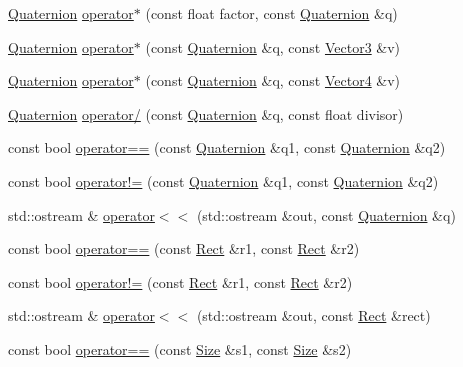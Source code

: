 \begin{DoxyCompactItemize}
\hyperlink{classprism_1_1_quaternion}{Quaternion} \hyperlink{namespaceprism_ad9f03413053b1efa6851344eb39a5982}{operator$\ast$} (const float factor, const \hyperlink{classprism_1_1_quaternion}{Quaternion} \&q)
\item 
\hyperlink{classprism_1_1_quaternion}{Quaternion} \hyperlink{namespaceprism_a8aebd3615ba448915f37140515a37b05}{operator$\ast$} (const \hyperlink{classprism_1_1_quaternion}{Quaternion} \&q, const \hyperlink{classprism_1_1_vector3}{Vector3} \&v)
\item 
\hyperlink{classprism_1_1_quaternion}{Quaternion} \hyperlink{namespaceprism_a2c4c5e120d8c4de9891f2261a50f100e}{operator$\ast$} (const \hyperlink{classprism_1_1_quaternion}{Quaternion} \&q, const \hyperlink{classprism_1_1_vector4}{Vector4} \&v)
\item 
\hyperlink{classprism_1_1_quaternion}{Quaternion} \hyperlink{namespaceprism_aec648937a53338bcd9879670877d0425}{operator/} (const \hyperlink{classprism_1_1_quaternion}{Quaternion} \&q, const float divisor)
\item 
const bool \hyperlink{namespaceprism_ac4ae112433b9ab32c801cccc9c3f74f0}{operator==} (const \hyperlink{classprism_1_1_quaternion}{Quaternion} \&q1, const \hyperlink{classprism_1_1_quaternion}{Quaternion} \&q2)
\item 
const bool \hyperlink{namespaceprism_a9e32551f997ae19dc52df146482405c1}{operator!=} (const \hyperlink{classprism_1_1_quaternion}{Quaternion} \&q1, const \hyperlink{classprism_1_1_quaternion}{Quaternion} \&q2)
\item 
std\+::ostream \& \hyperlink{namespaceprism_ad2beaed7a837821f0abc608cf6ac6c0f}{operator$<$$<$} (std\+::ostream \&out, const \hyperlink{classprism_1_1_quaternion}{Quaternion} \&q)
\item 
const bool \hyperlink{namespaceprism_abe409fa2ef458a2d477ed7845cf4b6a6}{operator==} (const \hyperlink{classprism_1_1_rect}{Rect} \&r1, const \hyperlink{classprism_1_1_rect}{Rect} \&r2)
\item 
const bool \hyperlink{namespaceprism_ad9f46c5ebd3cec844925173aaacbed9f}{operator!=} (const \hyperlink{classprism_1_1_rect}{Rect} \&r1, const \hyperlink{classprism_1_1_rect}{Rect} \&r2)
\item 
std\+::ostream \& \hyperlink{namespaceprism_a52fd2a97b66b06ba6e451e1890136ff4}{operator$<$$<$} (std\+::ostream \&out, const \hyperlink{classprism_1_1_rect}{Rect} \&rect)
\item 
const bool \hyperlink{namespaceprism_a2a7baeb09cd2ee29251667ad18a2bd00}{operator==} (const \hyperlink{classprism_1_1_size}{Size} \&s1, const \hyperlink{classprism_1_1_size}{Size} \&s2)

\end{DoxyCompactItemize}
